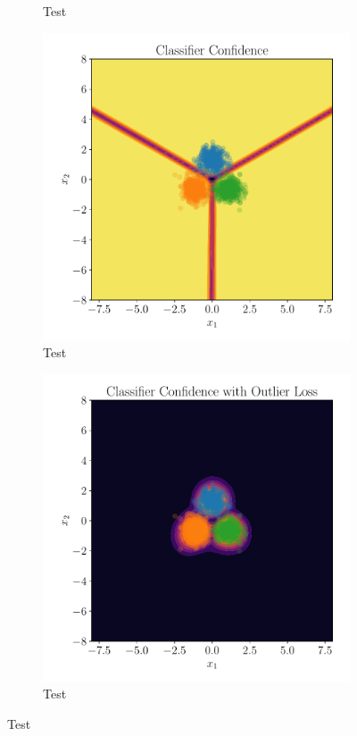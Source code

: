 \begin{figure}[htpb]
\begin{subfigure}[]{0.4\textwidth}
        \caption{Test}
        \label{fig:gmm_class_kl}
    \end{subfigure}
    \begin{subfigure}[]{0.4\textwidth}
        \centering
    \includegraphics[width=\linewidth]{figures/toy_example/gaussian_mixture/classifier_confidence.pdf}
        \caption{Test}
        \label{fig:gmm_confidence}
    \end{subfigure}
    \begin{subfigure}[]{0.4\textwidth}
        \centering
    \includegraphics[width=\linewidth]{figures/toy_example/gaussian_mixture/classifier_kl_confidence.pdf}
        \caption{Test}
        \label{fig:gmm_confidence_kl}
    \end{subfigure}
    

\end{figure}
